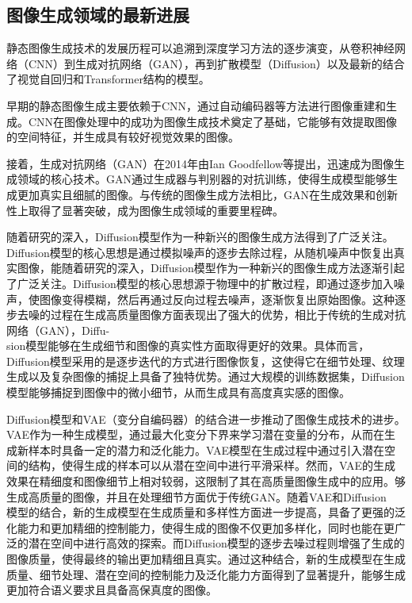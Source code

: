 \documentclass[UTF8]{ctexart}
\begin{document}
\subsection{图像生成领域的最新进展}
静态图像生成技术的发展历程可以追溯到深度学习方法的逐步演变，从卷积神经网络（CNN）到生成对抗网络（GAN），再到扩散模型（Diffusion）以及最新的结合了视觉自回归和Transformer结构的模型。\par
早期的静态图像生成主要依赖于CNN，通过自动编码器等方法进行图像重建和生成。CNN在图像处理中的成功为图像生成技术奠定了基础，它能够有效提取图像的空间特征，并生成具有较好视觉效果的图像。\par
接着，生成对抗网络（GAN）在2014年由Ian Goodfellow等提出，迅速成为图像生成领域的核心技术。GAN通过生成器与判别器的对抗训练，使得生成模型能够生成更加真实且细腻的图像。与传统的图像生成方法相比，GAN在生成效果和创新性上取得了显著突破，成为图像生成领域的重要里程碑。\par
随着研究的深入，Diffusion模型作为一种新兴的图像生成方法得到了广泛关注。\\Diffusion模型的核心思想是通过模拟噪声的逐步去除过程，从随机噪声中恢复出真实图像，能随着研究的深入，Diffusion模型作为一种新兴的图像生成方法逐渐引起了广泛关注。Diffusion模型的核心思想源于物理中的扩散过程，即通过逐步加入噪声，使图像变得模糊，然后再通过反向过程去噪声，逐渐恢复出原始图像。这种逐步去噪的过程在生成高质量图像方面表现出了强大的优势，相比于传统的生成对抗网络（GAN），Diffu-\\sion模型能够在生成细节和图像的真实性方面取得更好的效果。具体而言，Diffusion模型采用的是逐步迭代的方式进行图像恢复，这使得它在细节处理、纹理生成以及复杂图像的捕捉上具备了独特优势。通过大规模的训练数据集，Diffusion模型能够捕捉到图像中的微小细节，从而生成具有高度真实感的图像。\par
Diffusion模型和VAE（变分自编码器）的结合进一步推动了图像生成技术的进步。VAE作为一种生成模型，通过最大化变分下界来学习潜在变量的分布，从而在生成新样本时具备一定的潜力和泛化能力。VAE模型在生成过程中通过引入潜在空间的结构，使得生成的样本可以从潜在空间中进行平滑采样。然而，VAE的生成效果在精细度和图像细节上相对较弱，这限制了其在高质量图像生成中的应用。够生成高质量的图像，并且在处理细节方面优于传统GAN。随着VAE和Diffusion\\模型的结合，新的生成模型在生成质量和多样性方面进一步提高，具备了更强的泛化能力和更加精细的控制能力，使得生成的图像不仅更加多样化，同时也能在更广泛的潜在空间中进行高效的探索。而Diffusion模型的逐步去噪过程则增强了生成的图像质量，使得最终的输出更加精细且真实。通过这种结合，新的生成模型在生成质量、细节处理、潜在空间的控制能力及泛化能力方面得到了显著提升，能够生成更加符合语义要求且具备高保真度的图像。\par
\end{document}
